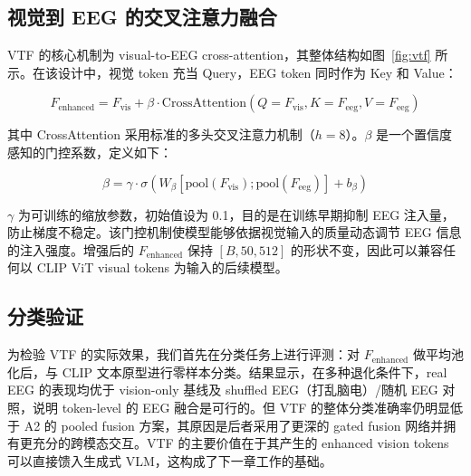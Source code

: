 \subsection{视觉到 EEG 的交叉注意力融合}

VTF 的核心机制为 visual-to-EEG cross-attention，其整体结构如图~\ref{fig:vtf} 所示。在该设计中，视觉 token 充当 Query，EEG token 同时作为 Key 和 Value：

\begin{equation}
  F_{\mathrm{enhanced}} = F_{\mathrm{vis}} + \beta \cdot \mathrm{CrossAttention}(Q=F_{\mathrm{vis}}, K=F_{\mathrm{eeg}}, V=F_{\mathrm{eeg}})
\end{equation}


其中 CrossAttention 采用标准的多头交叉注意力机制（$h=8$）。$\beta$ 是一个置信度感知的门控系数，定义如下：

\begin{equation}
  \beta = \gamma \cdot \sigma\left(W_\beta [\mathrm{pool}(F_{\mathrm{vis}}); \mathrm{pool}(F_{\mathrm{eeg}})] + b_\beta\right)
\end{equation}

$\gamma$ 为可训练的缩放参数，初始值设为 0.1，目的是在训练早期抑制 EEG 注入量，防止梯度不稳定。该门控机制使模型能够依据视觉输入的质量动态调节 EEG 信息的注入强度。增强后的 $F_{\mathrm{enhanced}}$ 保持 $[B, 50, 512]$ 的形状不变，因此可以兼容任何以 CLIP ViT visual tokens 为输入的后续模型。

\subsection{分类验证}

为检验 VTF 的实际效果，我们首先在分类任务上进行评测：对 $F_{\mathrm{enhanced}}$ 做平均池化后，与 CLIP 文本原型进行零样本分类。结果显示，在多种退化条件下，real EEG 的表现均优于 vision-only 基线及 shuffled EEG（打乱脑电）/随机 EEG 对照，说明 token-level 的 EEG 融合是可行的。但 VTF 的整体分类准确率仍明显低于 A2 的 pooled fusion 方案，其原因是后者采用了更深的 gated fusion 网络并拥有更充分的跨模态交互。VTF 的主要价值在于其产生的 enhanced vision tokens 可以直接馈入生成式 VLM，这构成了下一章工作的基础。
